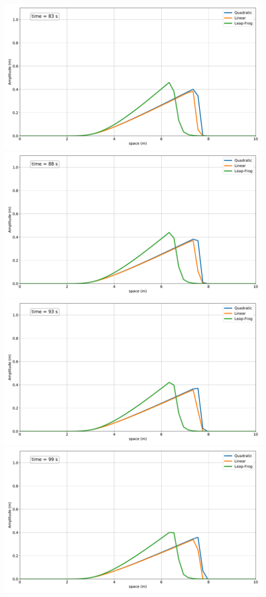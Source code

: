 \includegraphics[width=\linewidth]{../BurgersEquation/images/imp16.pdf}
\includegraphics[width=\linewidth]{../BurgersEquation/images/imp17.pdf}
\includegraphics[width=\linewidth]{../BurgersEquation/images/imp18.pdf}
\includegraphics[width=\linewidth]{../BurgersEquation/images/imp19.pdf}

